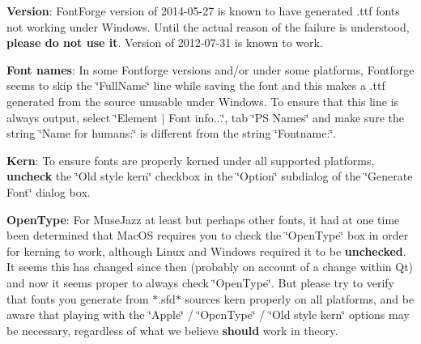 \begin{DoxyEnumerate}
\item {\bfseries Version}\+: Font\+Forge version of 2014-\/05-\/27 is known to have generated .ttf fonts not working under Windows. Until the actual reason of the failure is understood, {\bfseries please do not use it}. Version of 2012-\/07-\/31 is known to work.
\item {\bfseries Font names}\+: In some Fontforge versions and/or under some platforms, Fontforge seems to skip the \char`\"{}\+Full\+Name\char`\"{} line while saving the font and this makes a .ttf generated from the source unusable under Windows. To ensure that this line is always output, select \char`\"{}\+Element $\vert$ Font info...\char`\"{}, tab \char`\"{}\+P\+S Names\char`\"{} and make sure the string \char`\"{}\+Name for humans\+:\char`\"{} is different from the string \char`\"{}\+Fontname\+:\char`\"{}.
\item {\bfseries Kern}\+: To ensure fonts are properly kerned under all supported platforms, {\bfseries uncheck} the \char`\"{}\+Old style \textquotesingle{}kern\textquotesingle{}\char`\"{} checkbox in the \char`\"{}\+Option\char`\"{} subdialog of the \char`\"{}\+Generate Font\char`\"{} dialog box.
\item {\bfseries Open\+Type}\+: For Muse\+Jazz at least but perhaps other fonts, it had at one time been determined that Mac\+OS requires you to check the \char`\"{}\+Open\+Type\char`\"{} box in order for kerning to work, although Linux and Windows required it to be {\bfseries unchecked}. It seems this has changed since then (probably on account of a change within Qt) and now it seems proper to always check \char`\"{}\+Open\+Type\char`\"{}. But please try to verify that fonts you generate from $\ast$.sfd$\ast$ sources kern properly on all platforms, and be aware that playing with the \char`\"{}\+Apple\char`\"{} / \char`\"{}\+Open\+Type\char`\"{} / \char`\"{}\+Old style kern\char`\"{} options may be necessary, regardless of what we believe {\bfseries should} work in theory. 
\end{DoxyEnumerate}